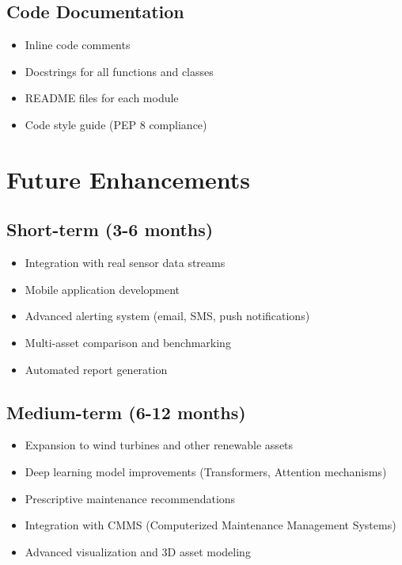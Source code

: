 \documentclass[12pt,a4paper]{article}
\begin{document}
\subsection{Code Documentation}
\begin{itemize}[leftmargin=*]
    \item Inline code comments
    \item Docstrings for all functions and classes
    \item README files for each module
    \item Code style guide (PEP 8 compliance)
\end{itemize}

\newpage

\section{Future Enhancements}

\subsection{Short-term (3-6 months)}
\begin{itemize}[leftmargin=*]
    \item Integration with real sensor data streams
    \item Mobile application development
    \item Advanced alerting system (email, SMS, push notifications)
    \item Multi-asset comparison and benchmarking
    \item Automated report generation
\end{itemize}

\subsection{Medium-term (6-12 months)}
\begin{itemize}[leftmargin=*]
    \item Expansion to wind turbines and other renewable assets
    \item Deep learning model improvements (Transformers, Attention mechanisms)
    \item Prescriptive maintenance recommendations
    \item Integration with CMMS (Computerized Maintenance Management Systems)
    \item Advanced visualization and 3D asset modeling
\end{itemize}
\end{document}
